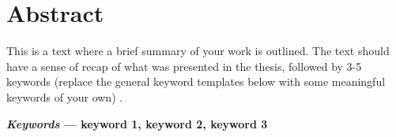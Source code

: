 


\section*{Abstract}
\vspace{-10pt}
This is a text where a brief summary of your work is outlined. The text should have a sense of recap of what was presented in the thesis, followed by 3-5 keywords (replace the general keyword templates below with some meaningful keywords of your own) .

\vspace{5pt}
%
\noindent \textbf{\textit{Keywords} --- keyword 1, keyword 2, keyword 3}


